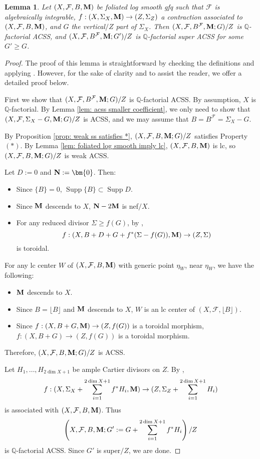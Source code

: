 \documentclass[11pt]{amsart}
\numberwithin{equation}{section}
\newcommand{\Mm}{{\bf{M}}}
\newcommand{\Nn}{{\bf{N}}}
\newcommand{\Qq}{\mathbb{Q}}
\newcommand{\Supp}{\operatorname{Supp}}
\newcommand{\Ff}{\mathcal{F}}
\newtheorem{lem}[thm]{Lemma}
\theoremstyle{definition}
\theoremstyle{definition}
\theoremstyle{definition}
\begin{document}
\begin{lem}\label{lem: fls imply acss}
Let $(X,\Ff,B,\Mm)$ be foliated log smooth gfq such that $\Ff$ is algebraically integrable, $f: (X,\Sigma_X,\Mm)\rightarrow (Z,\Sigma_Z)$ a contraction associated to $(X,\Ff,B,\Mm)$, and $G$ the vertical$/Z$ part of $\Sigma_X$. Then $(X,\Ff,B^\Ff,\Mm;G)/Z$ is $\Qq$-factorial ACSS, and $(X,\Ff,B^\Ff,\Mm;G')/Z$ is $\Qq$-factorial super ACSS for some $G'\geq G$.
\end{lem}
\begin{proof}
The proof of this lemma is straightforward by checking the definitions and applying \cite[Proposition 3.2]{AK00}. However, for the sake of clarity and to assist the reader, we offer a detailed proof below.

First we show that $(X,\Ff,B^\Ff,\Mm;G)/Z$ is $\Qq$-factorial ACSS. By assumption, $X$ is $\Qq$-factorial. By Lemma \ref{lem: acss smaller coefficient}, we only need to show that $(X,\Ff,\Sigma_X-G,\Mm;G)/Z$ is ACSS, and we may assume that $B=B^{\Ff}=\Sigma_X-G$.

 By Proposition \ref{prop: weak ss satisfies *}, $(X,\Ff,B,\Mm;G)/Z$ satisfies Property $(*)$. By Lemma \ref{lem: foliated log smooth imply lc}, $(X,\Ff,B,\Mm)$ is lc, so  $(X,\Ff,B,\Mm;G)/Z$ is weak ACSS.

Let $D:=0$ and $\Nn:=\bm{0}$. Then:
 \begin{itemize}
     \item Since $\{B\}=0$, $\Supp\{B\}\subset\Supp D$.
     \item Since $\Mm$ descends to $X$, $\Nn-2\Mm$ is nef$/X$.
     \item For any reduced divisor $\Sigma\geq f(G)$, by \cite[Proposition 3.2]{AK00}, 
$$f: (X,B+D+G+f^*(\Sigma-f(G)),\Mm)\rightarrow (Z,\Sigma)$$
is toroidal.
 \end{itemize}
 For any lc center $W$ of $(X,\Ff,B,\Mm)$ with generic point $\eta_W$, near $\eta_W$, we have the following:
 \begin{itemize}
     \item $\Mm$ descends to $X$.
     \item Since $B=\lfloor B\rfloor$ and $\Mm$ descends to $X$, $W$ is an lc center of $(X,\Ff,\lfloor B\rfloor)$.
     \item Since $f: (X,B+G,\Mm)\rightarrow (Z,f(G))$ is a toroidal morphism, $f: (X,B+G)\rightarrow (Z,f(G))$ is a toroidal morphism.
 \end{itemize}
 Therefore, $(X,\Ff,B,\Mm;G)/Z$ is ACSS. 
 
 
 Let $H_1,\dots, H_{2\dim X+1}$ be ample Cartier divisors on $Z$. By \cite[Proposition 3.2]{AK00}, $$f: (X,\Sigma_X+\sum_{i=1}^{2\dim X+1}f^*H_i,\Mm)\rightarrow (Z,\Sigma_Z+\sum_{i=1}^{2\dim X+1}H_i)$$ is associated with $(X,\Ff,B,\Mm)$. Thus
 $$\left(X,\Ff,B,\Mm;G':=G+\sum_{i=1}^{2\dim X+1}f^*H_i\right)/Z$$
 is $\Qq$-factorial ACSS. Since $G'$ is super$/Z$, we are done.
\end{proof}
\end{document}
